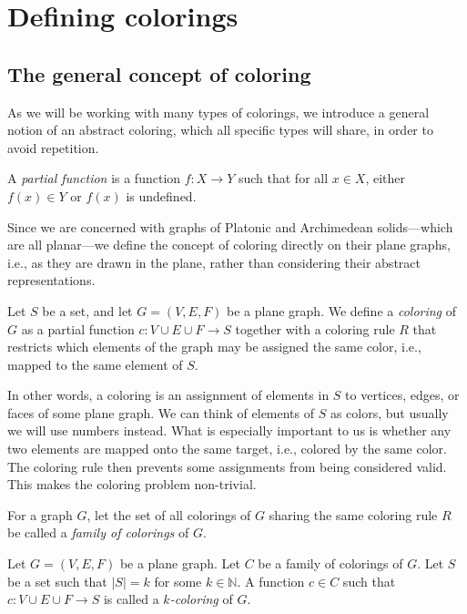 \chapter{Defining colorings}

\section{The general concept of coloring}

As we will be working with many types of colorings, we introduce a general notion of an abstract coloring, which all specific types will share, in order to avoid repetition.

\begin{defn}
    A \emph{partial function} is a function $f : X \rightarrow Y$ such that for all $x \in X$, either $f(x) \in Y$ or $f(x)$ is undefined.
\end{defn}

Since we are concerned with graphs of Platonic and Archimedean solids—which are all planar—we define the concept of coloring directly on their plane graphs, i.e., as they are drawn in the plane, rather than considering their abstract representations.

\begin{defn}[coloring]
    Let $S$ be a set, and let $G = (V, E, F)$ be a plane graph. We define a \emph{coloring} of $G$ as a partial function $c : V \cup E \cup F \rightarrow S$ together with a coloring rule $R$ that restricts which elements of the graph may be assigned the same color, i.e., mapped to the same element of $S$.
\end{defn}

In other words, a coloring is an assignment of elements in $S$ to vertices, edges, or faces of some plane graph. We can think of elements of $S$ as colors, but usually we will use numbers instead. What is especially important to us is whether any two elements are mapped onto the same target, i.e., colored by the same color. The coloring rule then prevents some assignments from being considered valid. This makes the coloring problem non-trivial.

\begin{defn}
    For a graph $G$, let the set of all colorings of $G$ sharing the same coloring rule $R$ be called a \emph{family of colorings} of $G$.
\end{defn}

\begin{defn}[$k$-coloring]
    Let $G = (V, E, F)$ be a plane graph. Let $C$ be a family of colorings of $G$. Let $S$ be a set such that $|S| = k$ for some $k \in \mathbb{N}$. A function $c \in C$ such that $c : V \cup E \cup F \rightarrow S$ is called a \emph{$k$-coloring} of $G$.
\end{defn}

